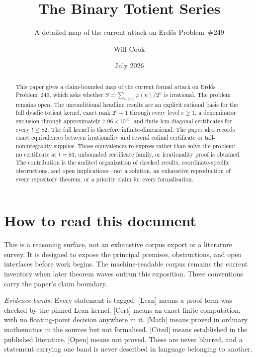 \documentclass[11pt]{article}
\title{The Binary Totient Series}
\subtitle{A detailed map of the current attack on Erd\H{o}s Problem~\#249}
\author{Will Cook}
\date{July 2026}
\theoremstyle{breakplain}
\theoremstyle{breakdefinition}
\theoremstyle{breakdefinition}
\newcommand{\ev}[1]{{\small\textsf{[#1]}}\xspace}
\newcommand{\ph}{\varphi}
\begin{document}
\maketitle

\paperprovenance

\begin{abstract}
This paper gives a claim-bounded map of the current formal attack on Erd\H{o}s
Problem~249, which asks whether
$S=\sum_{n\ge1}\ph(n)/2^n$ is irrational.  The problem remains open.
The unconditional headline results are an explicit rational basis for the
full dyadic totient kernel, exact rank $2^e+1$ through every level $e\ge1$, a denominator
exclusion through approximately $7.96\times10^{34}$, and finite
lcm-diagonal certificates for every $t\le82$.  The full kernel is therefore
infinite-dimensional.  The paper also records exact equivalences between
irrationality and several cofinal certificate or tail-nonintegrality supplies.
Those equivalences re-express rather than solve the problem: no certificate at
$t=83$, unbounded certificate family, or irrationality proof is obtained.  The
contribution is the audited organization of checked results,
coordinate-specific obstructions, and open implications---not a solution, an
exhaustive reproduction of every repository theorem, or a priority claim for
every formalisation.
\end{abstract}

\section*{How to read this document}

This is a reasoning surface, not an exhaustive corpus export or a literature
survey.  It is designed to expose the principal premises, obstructions, and
open interfaces before work begins.  The machine-readable corpus remains the
current inventory when later theorem waves outrun this exposition.  Three
conventions carry the paper's claim boundary.

\emph{Evidence bands.}  Every statement is tagged.  \ev{Lean} means a proof term
was checked by the pinned Lean kernel.  \ev{Cert} means an exact finite
computation, with no floating-point decision anywhere in it.  \ev{Math} means
proved in ordinary mathematics in the sources but not formalised.  \ev{Cited}
means established in the published literature.  \ev{Open} means not proved.
These are never blurred, and a statement carrying one band is never described in
language belonging to another.
\end{document}
